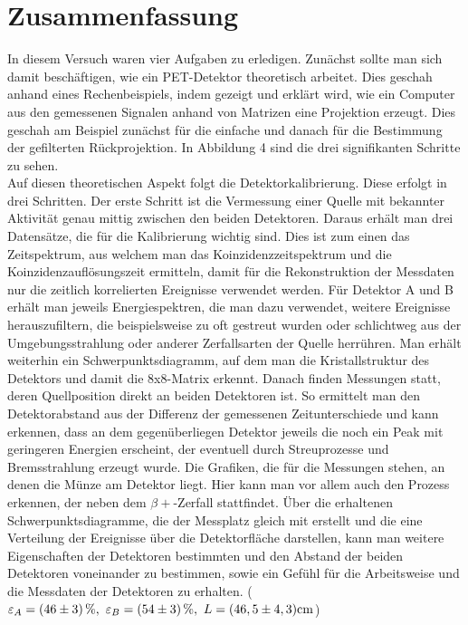 \section{Zusammenfassung}
In diesem Versuch waren vier Aufgaben zu erledigen. Zunächst sollte man sich damit beschäftigen, wie ein PET-Detektor theoretisch arbeitet. Dies
geschah anhand eines Rechenbeispiels, indem gezeigt und erklärt wird, wie ein Computer aus den gemessenen Signalen anhand von Matrizen eine Projektion
erzeugt. Dies geschah am Beispiel zunächst für die einfache und danach für die Bestimmung der gefilterten Rückprojektion. In Abbildung 4 sind die drei
signifikanten Schritte zu sehen. \\
Auf diesen theoretischen Aspekt folgt die Detektorkalibrierung. Diese erfolgt in drei Schritten. Der erste Schritt ist die Vermessung einer Quelle 
mit bekannter Aktivität genau mittig zwischen den beiden Detektoren. Daraus erhält man drei Datensätze, die für die Kalibrierung wichtig sind. Dies ist zum
einen das Zeitspektrum, aus welchem man das Koinzidenzzeitspektrum und die Koinzidenzauflösungszeit ermitteln, damit für die Rekonstruktion der Messdaten nur 
die zeitlich korrelierten Ereignisse verwendet werden. Für Detektor A und B erhält man jeweils Energiespektren, die man dazu verwendet, weitere Ereignisse 
herauszufiltern, die beispielsweise zu oft gestreut wurden oder schlichtweg aus der Umgebungsstrahlung oder anderer Zerfallsarten der Quelle herrühren.
Man erhält weiterhin ein Schwerpunktsdiagramm, auf dem man die Kristallstruktur des Detektors und damit die 8x8-Matrix erkennt. 
Danach finden Messungen statt, deren Quellposition direkt an beiden Detektoren ist. So ermittelt man den Detektorabstand aus der Differenz der gemessenen
Zeitunterschiede und kann erkennen, dass an dem gegenüberliegen Detektor jeweils die noch ein Peak mit geringeren Energien erscheint, der eventuell durch 
Streuprozesse und Bremsstrahlung erzeugt wurde. Die Grafiken, die für die Messungen stehen, an denen die Münze am Detektor liegt. Hier kann man vor allem auch 
den Prozess erkennen, der neben dem $\beta+$-Zerfall stattfindet. Über die erhaltenen Schwerpunktsdiagramme, die der Messplatz gleich mit erstellt und die eine Verteilung der Ereignisse über die Detektorfläche darstellen,
kann man weitere Eigenschaften der Detektoren bestimmten und den Abstand der beiden Detektoren voneinander zu bestimmen, sowie ein Gefühl für die Arbeitsweise
und die Messdaten der Detektoren zu erhalten. ($\varepsilon_A = \unit[(46\pm 3)]{\%},\ \varepsilon_B = \unit[(54\pm 3)]{\%}, \ L = (46,5\pm4,3)\unit{cm}$)
